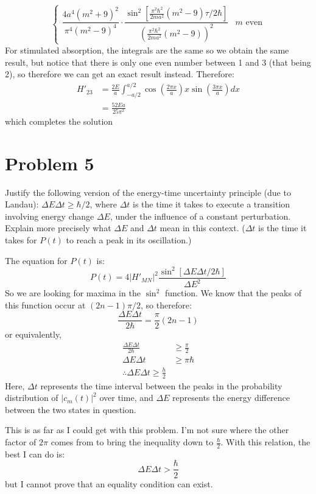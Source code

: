 \documentclass[10pt]{article}
\begin{document}
\begin{solution}
\[\begin{cases}
			\dfrac{4a^4 (m^2 + 9)^2}{\pi^4(m^2-9)^4} \cdot \dfrac{\sin^2\left[\frac{\pi^2 \hbar^2}{2ma^2}(m^2 - 9)\tau/2\hbar\right]}{\left( \frac{\pi^2 \hbar^2}{2ma^2}(m^2 - 9)\right)^2} & \text{$m$ even}
		\end{cases}
		\] 
		For stimulated absorption, the integrals are the same so we obtain the same result, but notice that there
		is only one even number between 1 and 3 (that being 2), so therefore we can get an exact result instead. 
		Therefore:
		\begin{align*}
			H'_{23} &= \frac{2E}{a}\int_{-a/2}^{a/2} \cos\left( \frac{2\pi x}{a} \right) x
			\sin\left( \frac{3 \pi x}{a} \right) dx\\
			&= \frac{52Ea}{25 \pi^2}
		\end{align*}
		which completes the solution
	\end{solution}

	\pagebreak
	\section*{Problem 5}
	Justify the following version of the energy-time uncertainty principle (due to Landau): $\Delta E\Delta t
	\ge \hbar/2$, where $\Delta t$ is the time it takes to execute a transition involving energy change 
	$\Delta E$, under the influence of a constant perturbation. Explain more precisely what $\Delta E$ and 
	$\Delta t$ mean in this context. ($\Delta t$ is the time it takes for $P(t)$ to reach a peak in its 
	oscillation.)

	\begin{solution}
		The equation for $P(t)$ is:
		\[
			P(t) = 4|H'_{MN}|^2 \frac{\sin^2\left[\Delta E\Delta t/2\hbar\right]}{\Delta E^2}
		\] 
		So we are looking for maxima in the $\sin^2$ function. We know that the peaks of this function occur 
		at $(2n-1)\pi/2$, so therefore: 
		\[
			\frac{\Delta E \Delta t}{2\hbar} = \frac{\pi}{2}(2n-1)
		\] 
		or equivalently, 
		\begin{align*}
			\frac{\Delta E \Delta t}{2\hbar} &\ge \frac{\pi}{2}\\
			\Delta E \Delta t &\ge \pi \hbar\\
			\therefore \Delta E \Delta t \ge \frac{h}{2}
		\end{align*}
		Here, $\Delta t$ represents the time interval between the peaks in the probability distribution of 
		$|c_m(t)|^2$ over time, and $\Delta E$ represents the energy difference between the two states in 
		question. 

		This is as far as I could get with this problem. I'm not sure where the other factor of $2\pi$ comes
		from to bring the inequality down to $\frac{\hbar}{2}$. With this relation, the best I can do is:
		\[
		\Delta E \Delta t > \frac{\hbar}{2}
		\] 
		but I cannot prove that an equality condition can exist. 
	\end{solution}
\end{document}
